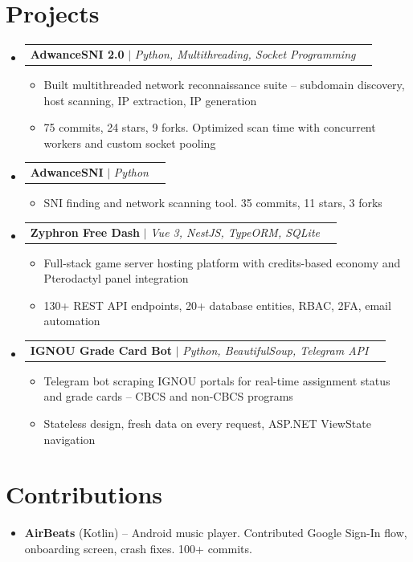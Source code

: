 \documentclass[letterpaper,11pt]{article}
\makeatletter
\newcommand{\resumeItem}[1]{
  \item\small{{#1 \vspace{-2pt}}}
}
\newcommand{\resumeProjectHeading}[2]{
    \item
    \begin{tabular*}{0.97\textwidth}{l@{\extracolsep{\fill}}r}
      \small#1 & #2 \\
    \end{tabular*}\vspace{-7pt}
}
\newcommand{\resumeSubHeadingListStart}{\begin{itemize}[leftmargin=0.15in, label={}]}
\newcommand{\resumeSubHeadingListEnd}{\end{itemize}}
\newcommand{\resumeItemListStart}{\begin{itemize}}
\newcommand{\resumeItemListEnd}{\end{itemize}\vspace{-5pt}}
\makeatother
\begin{document}
\section{Projects}
\resumeSubHeadingListStart

  \resumeProjectHeading
    {\textbf{AdwanceSNI 2.0} $|$ \emph{Python, Multithreading, Socket Programming}}{\href{https://github.com/SirYadav1/AdwanceSNI-2.0}{\small\faGithub}}
    \resumeItemListStart
      \resumeItem{Built multithreaded network reconnaissance suite -- subdomain discovery, host scanning, IP extraction, IP generation}
      \resumeItem{75 commits, 24 stars, 9 forks. Optimized scan time with concurrent workers and custom socket pooling}
    \resumeItemListEnd

  \resumeProjectHeading
    {\textbf{AdwanceSNI} $|$ \emph{Python}}{\href{https://github.com/SirYadav1/AdwanceSNI}{\small\faGithub}}
    \resumeItemListStart
      \resumeItem{SNI finding and network scanning tool. 35 commits, 11 stars, 3 forks}
    \resumeItemListEnd

  \resumeProjectHeading
    {\textbf{Zyphron Free Dash} $|$ \emph{Vue 3, NestJS, TypeORM, SQLite}}{\href{https://github.com/SirYadav1/zyphron-free-dash}{\small\faGithub}}
    \resumeItemListStart
      \resumeItem{Full-stack game server hosting platform with credits-based economy and Pterodactyl panel integration}
      \resumeItem{130+ REST API endpoints, 20+ database entities, RBAC, 2FA, email automation}
    \resumeItemListEnd

  \resumeProjectHeading
    {\textbf{IGNOU Grade Card Bot} $|$ \emph{Python, BeautifulSoup, Telegram API}}{\href{https://github.com/SirYadav1/ignou-gradecard-bot}{\small\faGithub}}
    \resumeItemListStart
      \resumeItem{Telegram bot scraping IGNOU portals for real-time assignment status and grade cards -- CBCS and non-CBCS programs}
      \resumeItem{Stateless design, fresh data on every request, ASP.NET ViewState navigation}
    \resumeItemListEnd

\resumeSubHeadingListEnd

\section{Contributions}
\resumeSubHeadingListStart
  \resumeItem{\textbf{AirBeats} (Kotlin) -- Android music player. Contributed Google Sign-In flow, onboarding screen, crash fixes. 100+ commits. \href{https://github.com/SirYadav1/AirBeats}{\small\faGithub}}
\resumeSubHeadingListEnd
\end{document}
